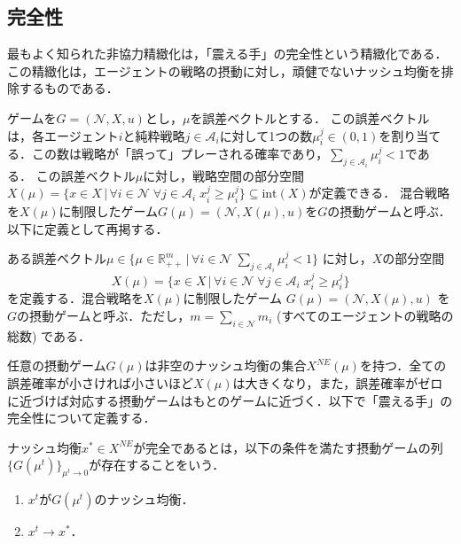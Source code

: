\documentclass{jsreport}
\begin{document}
\subsection{完全性}
最もよく知られた非協力精緻化は，「震える手」の完全性という精緻化である．この精緻化は，エージェントの戦略の摂動に対し，頑健でないナッシュ均衡を排除するものである．

ゲームを$G = (\mathcal{N}, X, u)$とし，$\mu$を誤差ベクトルとする．
この誤差ベクトルは，各エージェント$i$と純粋戦略$j \in \mathcal{A}_i$に対して1つの数$\mu_i^j \in (0, 1)$を割り当てる．この数は戦略が「誤って」プレーされる確率であり，$\sum_{j \in \mathcal{A}_i} \mu_i^j < 1$である．
この誤差ベクトル$\mu$に対し，戦略空間の部分空間$X(\mu) = \{x \in X \, | \, \forall i \in \mathcal{N} \; \forall j \in \mathcal{A}_i \; x_i^j \geq \mu_i^j\} \subseteq \mbox{int}(X)$が定義できる．
混合戦略を$X(\mu)$に制限したゲーム$G(\mu) = (\mathcal{N}, X(\mu), u)$を$G$の摂動ゲームと呼ぶ．以下に定義として再掲する．

\begin{screen}
  \begin{defi}
    ある誤差ベクトル$\mu \in \{\mu \in \mathbb{R}_{++}^m \, | \, \forall i \in \mathcal{N} \; \sum_{j \in \mathcal{A}_i} \mu_i^j < 1\}$
    に対し，$X$の部分空間
    \begin{equation}
      X(\mu) = \{x \in X \, | \, \forall i \in \mathcal{N} \; \forall j \in \mathcal{A}_i \; x_i^j \geq \mu_i^j\} \nonumber
    \end{equation}
    を定義する．混合戦略を$X(\mu)$に制限したゲーム
    $G(\mu) = (\mathcal{N}, X(\mu), u)$
    を$G$の摂動ゲームと呼ぶ．ただし，$m = \sum_{i \in \mathcal{N}} m_i$ (すべてのエージェントの戦略の総数) である．
  \end{defi}
\end{screen}

任意の摂動ゲーム$G(\mu)$は非空のナッシュ均衡の集合$X^{NE}(\mu)$を持つ．全ての誤差確率が小さければ小さいほど$X(\mu)$は大きくなり，また，誤差確率がゼロに近づけば対応する摂動ゲームはもとのゲームに近づく．以下で「震える手」の完全性について定義する．

\begin{screen}
  \begin{defi}[完全性]
    ナッシュ均衡$x^{*} \in X^{NE}$が完全であるとは，以下の条件を満たす摂動ゲームの列
    $\{G(\mu^t)\}_{\mu^t \to 0}$が存在することをいう．
    \begin{enumerate}
      \item $x^{t}$が$G(\mu^t)$のナッシュ均衡．
      \item $x^t \to x^{*}$．
    \end{enumerate}
  \end{defi}
\end{screen}
\end{document}
